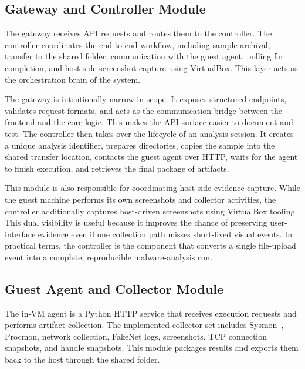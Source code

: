 \documentclass[a4paper,12pt,oneside]{report}
\begin{document}
\subsection{Gateway and Controller Module}
The gateway receives API requests and routes them to the controller. The controller coordinates the end-to-end workflow, including sample archival, transfer to the shared folder, communication with the guest agent, polling for completion, and host-side screenshot capture using VirtualBox. This layer acts as the orchestration brain of the system.

\par

\par

The gateway is intentionally narrow in scope. It exposes structured endpoints, validates request formats, and acts as the communication bridge between the frontend and the core logic. This makes the API surface easier to document and test. The controller then takes over the lifecycle of an analysis session. It creates a unique analysis identifier, prepares directories, copies the sample into the shared transfer location, contacts the guest agent over HTTP, waits for the agent to finish execution, and retrieves the final package of artifacts.

\par

\par

This module is also responsible for coordinating host-side evidence capture. While the guest machine performs its own screenshots and collector activities, the controller additionally captures host-driven screenshots using VirtualBox tooling. This dual visibility is useful because it improves the chance of preserving user-interface evidence even if one collection path misses short-lived visual events. In practical terms, the controller is the component that converts a single file-upload event into a complete, reproducible malware-analysis run.

\subsection{Guest Agent and Collector Module}
The in-VM agent is a Python HTTP service that receives execution requests and performs artifact collection. The implemented collector set includes Sysmon~\cite{sysmon}, Procmon, network collection, FakeNet logs, screenshots, TCP connection snapshots, and handle snapshots. This module packages results and exports them back to the host through the shared folder.
\end{document}
